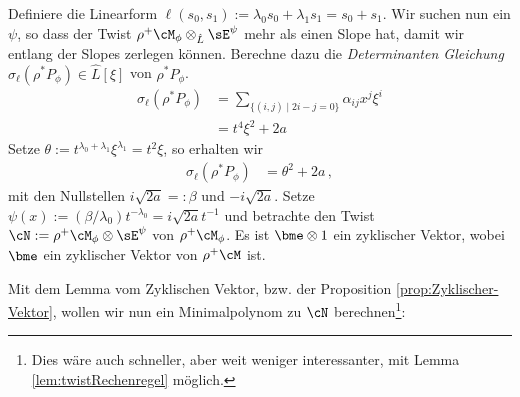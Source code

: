 Definiere die Linearform $\ell(s_0,s_1):=\lambda_0s_0+\lambda_1s_1=s_0+s_1$.
Wir suchen nun ein $\psi$, so dass der Twist $\rho^+\cM_{\phi}\otimes_{\hat
L}\sE^\psi$ mehr als einen Slope hat, damit wir entlang der Slopes zerlegen
können.  Berechne dazu die \emph{Determinanten Gleichung}
$\sigma_\ell(\rho^*P_{\phi})\in \hat L[\xi]$ von $\rho^*P_{\phi}$.
\begin{align*}
\sigma_\ell(\rho^*P_{\phi})
  &= \sum_{\{(i,j)\mid 2i-j=0\}}\alpha_{ij}x^{j}\xi^i\\
  &= t^4\xi^2 + 2a
\end{align*}
Setze $\theta:=t^{\lambda_0+\lambda_1}\xi^{\lambda_1}=t^2\xi$, so erhalten wir
\begin{align*}
\sigma_\ell(\rho^*P_{\phi}) &= \theta^2 + 2a \,,
\end{align*}
mit den Nullstellen $i\sqrt{2a}=:\beta$ und $-i\sqrt{2a}$.
Setze $\psi(x):=(\beta/\lambda_0)t^{-\lambda_0}=i\sqrt{2a}t^{-1}$ und
betrachte den Twist $\cN:=\rho^+\cM_{\phi}\otimes\sE^\psi$ von
$\rho^+\cM_{\phi}$.
Es ist $\bme\otimes 1$ ein zyklischer Vektor, wobei $\bme$ ein zyklischer
Vektor von $\rho^+\cM$ ist.
\iffalse
  Somit existieren $a_0(t)$ und $a_1(t)$ in $\hat L$, so dass
  \[
  0=\partial_t^2 (\bme\otimes 1) + (a_1(t)\partial_t + a_0(t)) \bme\otimes 1
  \]
  und damit ist dann $\cN=\cD/\cD\cdot(\partial_t^2+a_1(t)\partial_t+a_0(t))$.
\fi
Mit dem Lemma vom Zyklischen Vektor, bzw. der Proposition
\ref{prop:Zyklischer-Vektor}, wollen wir nun ein Minimalpolynom zu $\cN$
berechnen\footnote{
Dies wäre auch schneller, aber weit weniger interessanter, mit Lemma
\ref{lem:twistRechenregel} möglich.
}:
